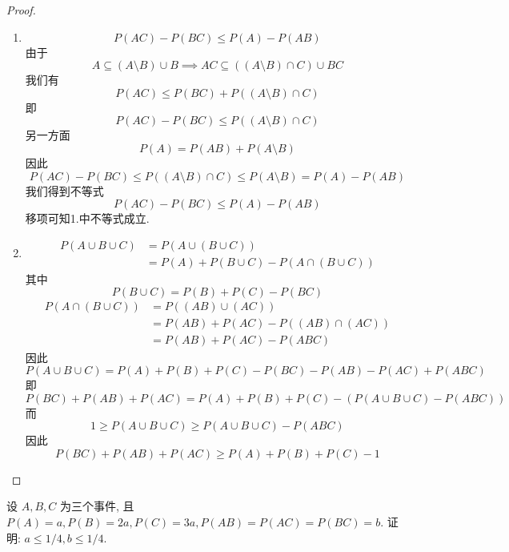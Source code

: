 \documentclass[../main.tex]{subfiles}
\begin{document}
\begin{proof}
    \begin{enumerate}
        \item \[
        P\left( AC \right)-P\left( BC \right)\le P\left( A \right)-P\left( AB \right)    
        \] 由于 \[
        A\subseteq \left( A\setminus B \right)\cup B\implies AC \subseteq \left( \left( A\setminus B \right)\cap C  \right)  \cup BC
        \]我们有 \[
        P\left( AC \right)\le P\left( BC \right)+ P\left( \left( A\setminus B \right)\cap C  \right)   
        \]即\[
        P\left( AC \right)-P\left( BC \right)\le P\left( \left( A\setminus B \right)\cap C  \right)   
        \] 另一方面 \[
        P\left( A \right)= P\left( AB \right)+ P\left( A\setminus B \right)   
        \]因此 \[
        P\left( AC \right)-P\left( BC \right)\le P\left( \left( A\setminus B \right)\cap C  \right)\le P\left( A\setminus B \right)= P\left( A \right)-P\left( AB \right)      
        \]我们得到不等式 \[
        P\left( AC \right)-P\left( BC \right)\le P\left( A \right)-P\left( AB \right)    
        \]移项可知1.中不等式成立.
        \item  \[
  \begin{aligned}
 P\left( A\cup B\cup C \right)&=  P\left( A\cup \left( B\cup C \right)  \right)\\ 
  &= P\left( A \right)+ P\left( B\cup C \right)    -P\left( A\cap \left( B\cup C \right)  \right) 
  \end{aligned}
        \]其中 \[
        P\left( B\cup C \right)= P\left( B \right)+ P\left( C \right)-P\left( BC \right)    
        \] \[
        \begin{aligned}
        P\left( A\cap \left( B\cup C \right)  \right)&=  P\left( \left( AB \right)\cup \left( AC \right)   \right)\\ 
         &= P\left( AB \right)+ P\left( AC \right)-P\left( \left( AB \right)\cap \left( AC \right)   \right)\\ 
          &= P\left( AB \right)+ P\left( AC \right)-P\left( ABC \right)         
        \end{aligned}
        \]因此 \[
        P\left( A\cup B\cup C \right)= P\left( A \right)+ P\left( B \right)+ P\left( C \right)-P\left( BC \right)-P\left( AB \right)-P\left( AC \right)+ P\left( ABC \right)        
        \]即 \[
        P\left( BC \right)+ P\left( AB \right)+ P\left( AC \right)= P\left( A \right)+ P\left( B \right)+ P\left( C \right)-\left( P\left( A\cup B\cup C \right)-P\left( ABC \right)   \right)       
        \]而 \[
        1\ge P\left( A\cup B\cup C \right)\ge P\left( A\cup B\cup C \right)-P\left( ABC \right)   
        \]因此 \[
        P\left( BC \right)+ P\left( AB \right)+ P\left( AC \right)\ge P\left( A \right)+ P\left( B \right)+ P\left( C \right)-1      
        \]
    \end{enumerate}
    
\end{proof}
\begin{exercise}{}{}
设 $A, B, C$ 为三个事件, 且 $P(A) = a, P(B) = 2a, P(C) = 3a, P(AB) = P(AC) = P(BC) = b$. 证明: $a \le 1/4, b \le 1/4$.
\end{exercise}
\end{document}
